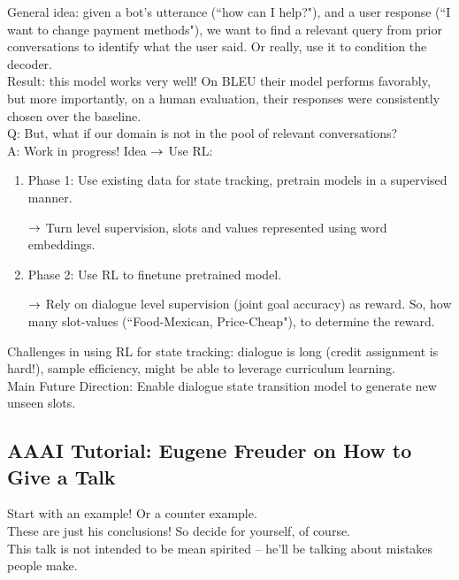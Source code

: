 General idea: given a bot's utterance (``how can I help?"), and a user response (``I want to change payment methods"), we want to find a relevant query from prior conversations to identify what the user said. Or really, use it to condition the decoder. \\

Result: this model works very well! On BLEU their model performs favorably, but more importantly, on a human evaluation, their responses were consistently chosen over the baseline. \\

Q: But, what if our domain is not in the pool of relevant conversations? \\

A: Work in progress! Idea $\rightarrow$ Use RL:
\begin{enumerate}
    \item Phase 1: Use existing data for state tracking, pretrain models in a supervised manner.
    
    $\rightarrow$ Turn level supervision, slots and values represented using word embeddings.
    
    \item Phase 2: Use RL to finetune pretrained model.
    
    $\rightarrow$ Rely on dialogue level supervision (joint goal accuracy) as reward. So, how many slot-values (``Food-Mexican, Price-Cheap"), to determine the reward.
\end{enumerate}

Challenges in using RL for state tracking: dialogue is long (credit assignment is hard!), sample efficiency, might be able to leverage curriculum learning. \\

Main Future Direction: Enable dialogue state transition model to generate new unseen slots.


\spacerule
\subsection{AAAI Tutorial: Eugene Freuder on How to Give a Talk}


Start with an example! Or a counter example. \\

These are just his conclusions! So decide for yourself, of course. \\

This talk is not intended to be mean spirited -- he'll be talking about mistakes people make. \\

